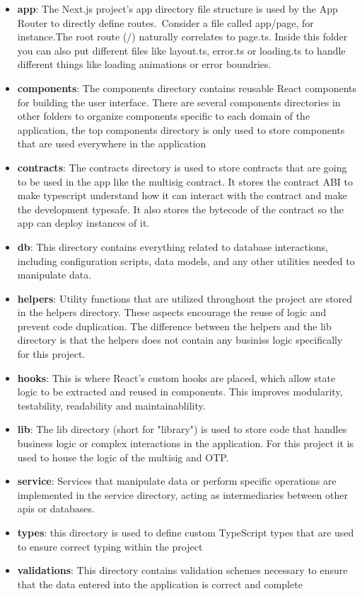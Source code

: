 \begin{itemize}
	\item \textbf{app}: The Next.js project's app directory file structure is used by the App Router to directly define routes. Consider a file called app/page, for instance.The root route (/) naturally correlates to page.ts. Inside this folder you can also put different files like layout.ts, error.ts or loading.ts to handle different things like loading animations or error boundries.
	\item \textbf{components}: The components directory contains reusable React components for building the user interface. There are several components directories in other folders to organize components specific to each domain of the application, the top components directory is only used to store components that are used everywhere in the application
	\item \textbf{contracts}: The contracts directory is used to store contracts that are going to be used in the app like the multisig contract. It stores the contract ABI to make typescript understand how it can interact with the contract and make the development typesafe. It also stores the bytecode of the contract so the app can deploy instances of it.
	\item \textbf{db}: This directory contains everything related to database interactions, including configuration scripts, data models, and any other utilities needed to manipulate data.
	\item \textbf{helpers}: Utility functions that are utilized throughout the project are stored in the helpers directory. These aspects encourage the reuse of logic and prevent code duplication. The difference between the helpers and the lib directory is that the helpers does not contain any businiss logic specifically for this project.
	\item \textbf{hooks}: This is where React's custom hooks are placed, which allow state logic to be extracted and reused in components. This improves modularity, testability, readability and maintainablility.
	\item \textbf{lib}: The lib directory (short for "library") is used to store code that handles business logic or complex interactions in the application. For this project it is used to house the logic of the multisig and OTP.
	\item \textbf{service}: Services that manipulate data or perform specific operations are implemented in the service directory, acting as intermediaries between other apis or databases.
	\item \textbf{types}: this directory is used to define custom TypeScript types that are used to ensure correct typing within the project
	\item \textbf{validations}: This directory contains validation schemes necessary to ensure that the data entered into the application is correct and complete
\end{itemize}
